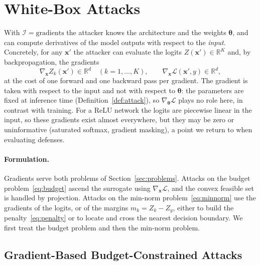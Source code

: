 \documentclass[10pt,a4paper]{extarticle}
\theoremstyle{definition}
\newcommand{\R}{\mathbb{R}}
\newcommand{\Loss}{\mathcal{L}}
\newcommand{\x}{\mathbf{x}}
\newcommand{\xadv}{\mathbf{x}'}
\newcommand{\btheta}{\boldsymbol{\theta}}
\begin{document}
\section{White-Box Attacks}\label{sec:whitebox}

With \(\mathcal{I}=\text{gradients}\) the attacker knows the architecture and the weights \(\btheta\), and can compute derivatives of the model outputs with respect to the \emph{input}. Concretely, for any \(\xadv\) the attacker can evaluate the logits \(Z(\xadv)\in\R^K\) and, by backpropagation, the gradients
\[
\nabla_{\x}Z_k(\xadv)\in\R^d\quad(k=1,\dots,K),
\qquad
\nabla_{\x}\Loss(\xadv,y)\in\R^d,
\]
at the cost of one forward and one backward pass per gradient. The gradient is taken with respect to the input and not with respect to \(\btheta\): the parameters are fixed at inference time (Definition~\ref{def:attack}), so \(\nabla_{\btheta}\Loss\) plays no role here, in contrast with training. For a ReLU network the logits are piecewise linear in the input, so these gradients exist almost everywhere, but they may be zero or uninformative (saturated softmax, gradient masking), a point we return to when evaluating defenses.

\paragraph{Formulation.} Gradients serve both problems of Section~\ref{sec:problems}. Attacks on the budget problem~\eqref{eq:budget} ascend the surrogate using \(\nabla_{\x}\Loss\), and the convex feasible set is handled by projection. Attacks on the min-norm problem~\eqref{eq:minnorm} use the gradients of the logits, or of the margins \(m_k=Z_k-Z_y\), either to build the penalty~\eqref{eq:penalty} or to locate and cross the nearest decision boundary. We first treat the budget problem and then the min-norm problem.

\subsection{Gradient-Based Budget-Constrained Attacks}\label{sec:pgd}
\end{document}
